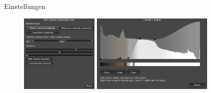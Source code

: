 \documentclass[final,hyperref={pdfpagelabels=false}]{beamer}
\begin{document}
\begin{frame}[t]
\begin{columns}[t]
\begin{column}{.465\textwidth}
\end{column} %



\begin{column}{.025\textwidth}\end{column} %

\end{columns} %


\begin{columns}[t] %

\begin{column}{.025\textwidth}\end{column} %

\begin{column}{.465\textwidth} %


\begin{block}{Einstellungen}

    \begin{figure}
    	\center
        \includegraphics[width=0.35\textwidth]{editMenu}
        \includegraphics[width=0.5475\textwidth]{transferfunction}
    \end{figure}


\end{block}



\end{column}
\end{columns}
\end{frame}
\end{document}
